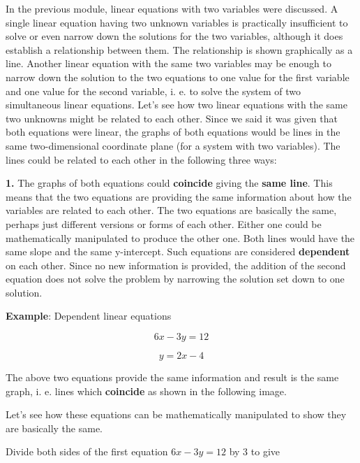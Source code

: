In the previous module, linear equations with two variables were discussed. A single
linear equation having two unknown variables is practically insufficient to solve or even
narrow down the solutions for the two variables, although it does establish a relationship
between them. The relationship is shown graphically as a line. Another linear equation
with the same two variables may be enough to narrow down the solution to the two equations
to one value for the first variable and one value for the second variable, i. e. to solve
the system of two simultaneous linear equations. Let's see how two linear equations with
the same two unknowns might be related to each other. Since we said it was given that both
equations were linear, the graphs of both equations would be lines in the same
two-dimensional coordinate plane (for a system with two variables). The lines could be
related to each other in the following three ways:



\textbf{1.} The graphs of both equations could \textbf{coincide} giving the \textbf{same line}. This means that the two equations are providing the same information about how the variables are related to each other. The two equations are basically the same, perhaps just different versions or forms of each other. Either one could be mathematically manipulated to produce the other one. Both lines would have the same slope and the same y-intercept. Such equations are considered \textbf{dependent} on each other. Since no new information is provided, the addition of the second equation does not solve the problem by narrowing the solution set down to one solution.



\textbf{Example}: Dependent linear equations



$$6x - 3y = 12 $$

$$y = 2x - 4 $$



The above two equations provide the same information and result is the same graph, i. e.
lines which \textbf{coincide} as shown in the following image.






Let's see how these equations can be mathematically manipulated to show they are basically the same.



Divide both sides of the first equation $6x - 3y = 12 $ by 3 to give



